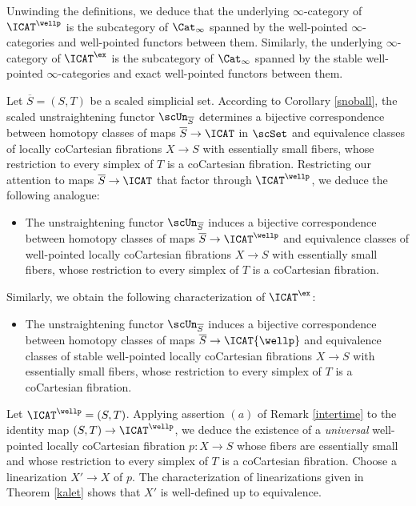 \begin{remark}
Unwinding the definitions, we deduce that the underlying $\infty$-category
of $\ICAT^{\wellp}$ is the subcategory of $\Cat_{\infty}$ spanned by the well-pointed
$\infty$-categories and well-pointed functors between them. Similarly, the underlying
$\infty$-category of $\ICAT^{\ex}$ is the subcategory of $\Cat_{\infty}$ spanned by the
stable well-pointed $\infty$-categories and exact well-pointed functors between them.
\end{remark}

\begin{remark}\label{intertime}
Let $\overline{S} = (S,T)$ be a scaled simplicial set. According to Corollary
\ref{snoball}, the scaled unstraightening functor $\scUn_{ \overline{S} }$ determines
a bijective correspondence between homotopy classes of maps
$\overline{S} \rightarrow \ICAT$ in $\scSet$ and equivalence classes
of locally coCartesian fibrations $X \rightarrow S$ with essentially small fibers,
whose restriction to every simplex of $T$ is a coCartesian fibration. Restricting
our attention to maps $\overline{S} \rightarrow \ICAT$ that factor through
$\ICAT^{\wellp}$, we deduce the following analogue:
\begin{itemize}
\item[$(a)$] The unstraightening functor $\scUn_{\overline{S}}$ induces a bijective
correspondence between homotopy classes of maps $\overline{S} \rightarrow
\ICAT^{\wellp}$ and equivalence classes of well-pointed locally coCartesian fibrations $X \rightarrow S$
with essentially small fibers, whose restriction to every simplex of $T$ is a coCartesian fibration.
\end{itemize}
Similarly, we obtain the following characterization of $\ICAT^{\ex}$:
\begin{itemize}
\item[$(b)$] The unstraightening functor $\scUn_{ \overline{S} }$ induces a bijective
correspondence between homotopy classes of maps $\overline{S} \rightarrow \ICAT{\wellp}$
and equivalence classes of stable well-pointed locally coCartesian fibrations
$X \rightarrow S$ with essentially small fibers, whose restriction to every simplex of $T$ is a coCartesian fibration.
\end{itemize}
\end{remark}

Let $\ICAT^{\wellp} = (S,T)$. Applying assertion $(a)$ of Remark \ref{intertime} to the identity
map $(S,T) \rightarrow \ICAT^{\wellp}$, we deduce the existence of a {\em universal}
well-pointed locally coCartesian fibration $p: X \rightarrow S$ whose fibers are essentially
small and whose restriction to every simplex of $T$ is a coCartesian fibration.
Choose a linearization $X' \rightarrow X$ of $p$. The characterization
of linearizations given in Theorem \ref{kalet} shows that $X'$ is well-defined up
to equivalence. 

